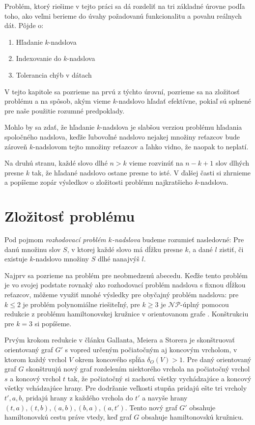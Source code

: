 Problém, ktorý riešime v tejto práci sa dá rozdeliť na tri základné úrovne podľa toho,
ako veľmi berieme do úvahy požadovanú funkcionalitu a povahu reálnych dát. Pôjde o:
\begin{enumerate}
    \item Hľadanie $k$-nadslova
    \item Indexovanie do $k$-nadslova
    \item Tolerancia chýb v dátach
\end{enumerate}
V tejto kapitole sa pozrieme na prvú z týchto úrovní, pozrieme sa na zložitosť problému
a na spôsob, akým vieme $k$-nadslovo hľadať efektívne, pokiaľ sú splnené pre naše
použitie rozumné predpoklady.

Mohlo by sa zdať, že hľadanie $k$-nadslova je slabšou verziou problému hľadania
spoločného nadslova, keďže ľubovoľné nadslovo nejakej množiny reťazcov bude zároveň
$k$-nadslovom tejto množiny reťazcov a ľahko vidno, že naopak to neplatí.

Na druhú stranu, každé slovo dlhé $n > k$ vieme rozvinúť na $n - k + 1$ slov dlhých
presne $k$ tak, že hľadané nadslovo ostane presne to isté. V ďalšej časti si zhrnieme
a popíšeme zopár výsledkov o zložitosti problému najkratšieho $k$-nadslova.


\section{Zložitosť problému}

\begin{defn}
Pod pojmom \emph{rozhodovací problém $k$-nadslova} budeme rozumieť nasledovné:
Pre danú množinu slov $S$, v ktorej každé slovo má dĺžku presne $k$,
a dané $l$ zistiť, či existuje $k$-nadslovo množiny $S$ dlhé nanajvýš $l$.
\end{defn}

Najprv sa pozrieme na problém pre neobmedzenú abecedu. Keďže tento problém je
vo svojej podstate rovnaký ako rozhodovací problém nadslova s fixnou dĺžkou reťazcov, môžeme využiť mnohé výsledky
pre obyčajný problém nadslova: pre $k \leq 2$ je problém polynomiálne riešiteľný,
pre $k \ge 3$ je $\mathcal{NP}$-úplný pomocou redukcie z problému hamiltonovskej
kružnice v orientovanom grafe \cite{superstring}. Konštrukciu pre $k = 3$ si popíšeme.

Prvým krokom redukcie v článku Gallanta, Meiera a Storera je skonštruovať orientovaný
graf $G'$ s vopred určeným počiatočným aj koncovým vrcholom, v ktorom každý vrchol $V$
okrem koncového spĺňa $\delta_O(V) > 1$. Pre daný orientovaný graf $G$
skonštruujú nový graf rozdelením niektorého vrchola na počiatočný vrchol $s$ a
koncový vrchol $t$ tak, že počiatočný si zachová všetky vychádzajúce a koncový
všetky vchádzajúce hrany. Pre dodržanie veľkosti stupňa pridajú ešte tri vrcholy
$t', a, b$, pridajú hrany z každého vrchola do $t'$ a navyše hrany $(t, a), (t, b),
(a, b), (b, a), (a, t')$. Tento nový graf $G'$ obsahuje hamiltonovskú cestu práve vtedy,
keď graf $G$ obsahuje hamiltonovskú kružnicu.

